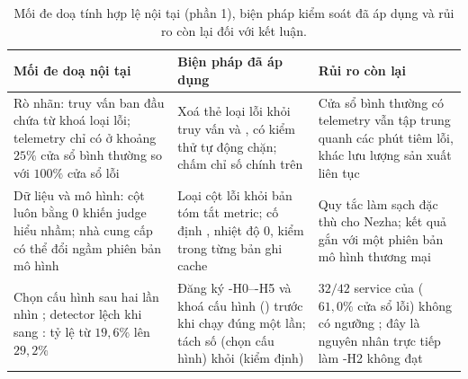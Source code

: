 \begin{table}[H]
  \centering
  \caption[Mối đe doạ tính hợp lệ nội tại, biện pháp và rủi ro còn lại]{Mối đe doạ tính hợp lệ nội tại (phần 1), biện pháp kiểm soát đã áp dụng và rủi ro còn lại đối với kết luận.}
  \label{tab:ch7-hop-le-noitai}
  \tblfont
  \tblsetup
  \setlength{\tabcolsep}{4pt}
  \begin{tabularx}{\linewidth}{|>{\raggedright\arraybackslash}p{4.1cm}|Y|>{\raggedright\arraybackslash}p{4.2cm}|}
    \hline
    \textbf{Mối đe doạ nội tại} & \textbf{Biện pháp đã áp dụng} & \textbf{Rủi ro còn lại} \\
    \hline
    Rò nhãn: truy vấn  ban đầu chứa từ khoá loại lỗi; telemetry chỉ có ở khoảng $25\%$ cửa sổ bình thường so với $100\%$ cửa sổ lỗi & Xoá thẻ loại lỗi khỏi truy vấn  và , có kiểm thử tự động chặn; chấm chỉ số chính trên  & Cửa sổ bình thường có telemetry vẫn tập trung quanh các phút tiêm lỗi, khác lưu lượng sản xuất liên tục \\
    \hline
    Dữ liệu và mô hình: cột  luôn bằng $0$ khiến judge hiểu nhầm; nhà cung cấp có thể đổi ngầm phiên bản mô hình & Loại cột lỗi khỏi bản tóm tắt metric; cố định , nhiệt độ $0$, kiểm  trong từng bản ghi cache & Quy tắc làm sạch đặc thù cho Nezha; kết quả gắn với một phiên bản mô hình thương mại \\
    \hline
    Chọn cấu hình sau hai lần nhìn ; detector lệch khi sang : tỷ lệ  từ $19{,}6\%$ lên $29{,}2\%$ & Đăng ký \hyp{H0}--\hyp{H5} và khoá cấu hình () trước khi chạy  đúng một lần; tách số  (chọn cấu hình) khỏi  (kiểm định) & $32/42$ service của  ($61{,}0\%$ cửa sổ lỗi) không có ngưỡng ; đây là nguyên nhân trực tiếp làm \hyp{H2} không đạt \\
    \hline
  \end{tabularx}
\end{table}

